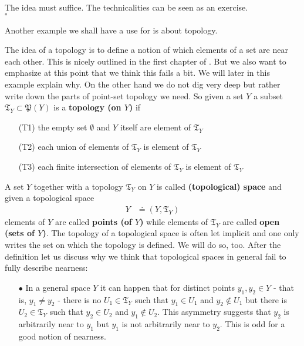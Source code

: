 \begin{prf}
The idea must suffice. The technicalities can be seen as an exercise.
\\
\phantom{proven}
\hfill
$\square$
\end{prf}
Another example we shall have a use for is about topology.
\\
\begin{exa}
\label{exa:topology}
The idea of a topology is to define a notion of which elements of a set are near each other. This is nicely outlined in the first chapter of \cite{797789bc}. But we also want to emphasize at this point that we think this fails a bit. We will later in this example explain why. On the other hand we do not dig very deep but rather write down the parts of point-set topology we need. So given a set $Y$ a subset $\mathfrak{T}_{Y} \subset \mathfrak{P}(Y)$ is a \textbf{topology (on $Y$)} if
\begin{enumerate}
\item[(T1)]
the empty set $\emptyset$ and $Y$ itself are element of $\mathfrak{T}_{Y}$
\item[(T2)]
each union of elements of $\mathfrak{T}_{Y}$ is element of $\mathfrak{T}_{Y}$
\item[(T3)]
each finite intersection of elements of $\mathfrak{T}_{Y}$ is element of $\mathfrak{T}_{Y}$
\end{enumerate}
A set $Y$ together with a topology $\mathfrak{T}_{Y}$ on $Y$ is called \textbf{(topological) space} and given a topological space
\begin{align*}
  Y
  &\doteq
  (Y,\mathfrak{T}_{Y})
\end{align*}
elements of $Y$ are called \textbf{points (of $Y$)} while elements of $\mathfrak{T}_{Y}$ are called \textbf{open (sets of $Y$)}. The topology of a topological space is often let implicit and one only writes the set on which the topology is defined. We will do so, too. After the definition let us discuss why we think that topological spaces in general fail to fully describe nearness:
\begin{enumerate}
\item[$\bullet$]
In a general space $Y$ it can happen that for distinct points $y_{1},y_{2} \in Y$ - that is, $y_{1} \neq y_{2}$ - there is no $U_{1} \in \mathfrak{T}_{Y}$ such that $y_{1} \in U_{1}$ and $y_{2} \notin U_{1}$ but there is $U_{2} \in \mathfrak{T}_{Y}$ such that $y_{2} \in U_{2}$ and $y_{1} \notin U_{2}$. This asymmetry suggests that $y_{2}$ is arbitrarily near to $y_{1}$ but $y_{1}$ is not arbitrarily near to $y_{2}$. This is odd for a good notion of nearness.

\end{enumerate}
\end{exa}
